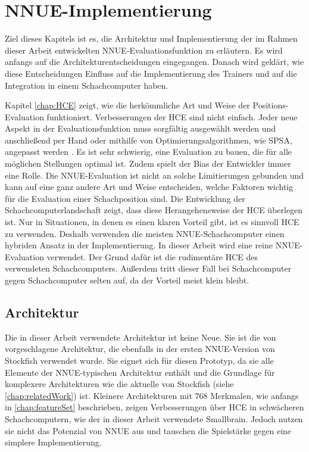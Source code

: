 \chapter{NNUE-Implementierung}

Ziel dieses Kapitels ist es, die Architektur und Implementierung der im Rahmen dieser Arbeit entwickelten \ac{NNUE}-Evaluationsfunktion zu erläutern. Es wird anfangs auf die Architekturentscheidungen eingegangen. Danach wird geklärt, wie diese Entscheidungen Einfluss auf die Implementierung des Trainers und auf die Integration in einem Schachcomputer haben.

Kapitel \autoref{chap:HCE} zeigt, wie die herkömmliche Art und Weise der Positions-Evaluation funktioniert. Verbesserungen der \ac{HCE} sind nicht einfach. Jeder neue Aspekt in der Evaluationsfunktion muss sorgfältig ausgewählt werden und anschließend per Hand oder mithilfe von Optimierungsalgorithmen, wie \zb{} \ac{SPSA}, angepasst werden \cite{spall1992multivariate}. Es ist sehr schwierig, eine Evaluation zu bauen, die für alle möglichen Stellungen optimal ist. Zudem spielt der Bias der Entwickler immer eine Rolle. Die \ac{NNUE}-Evaluation ist nicht an solche Limitierungen gebunden und kann auf eine ganz andere Art und Weise entscheiden, welche Faktoren wichtig für die Evaluation einer Schachposition sind. Die Entwicklung der Schachcomputerlandschaft zeigt, dass diese Herangehensweise der \ac{HCE} überlegen ist. Nur in Situationen, in denen es einen klaren Vorteil gibt, ist es sinnvoll \ac{HCE} zu verwenden. Deshalb verwenden die meisten \ac{NNUE}-Schachcomputer einen hybriden Ansatz in der Implementierung. In dieser Arbeit wird eine reine \ac{NNUE}-Evaluation verwendet. Der Grund dafür ist die rudimentäre \ac{HCE} des verwendeten Schachcomputers. Außerdem tritt dieser Fall bei Schachcomputer gegen Schachcomputer selten auf, da der Vorteil meist klein bleibt.

\section{Architektur}

Die in dieser Arbeit verwendete Architektur ist keine Neue. Sie ist die von \citeauthor{YNasu2018} \cite{YNasu2018} vorgeschlagene Architektur, die ebenfalls in der ersten \ac{NNUE}-Version von Stockfish verwendet wurde. Sie eignet sich für diesen Prototyp, da sie alle Elemente der \ac{NNUE}-typischen Architektur enthält und die Grundlage für komplexere Architekturen wie die aktuelle von Stockfish (siehe \autoref{chap:relatedWork}) ist. Kleinere Architekturen mit 768 Merkmalen, wie anfangs in \autoref{chap:featureSet} beschrieben, zeigen Verbesserungen über \ac{HCE} in schwächeren Schachcomputern, wie der in dieser Arbeit verwendete \ac{Smallbrain}. Jedoch nutzen sie nicht das Potenzial von \ac{NNUE} aus und tauschen die Spielstärke gegen eine simplere Implementierung.

